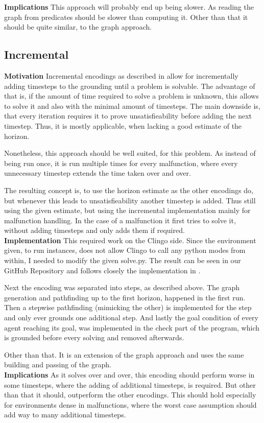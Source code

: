 \noindent \textbf{Implications} This approach will probably end up being slower. As reading the graph from predicates should be slower than computing it. Other than that it should be quite similar, to the graph approach.

\subsection{Incremental}
\textbf{Motivation} Incremental encodings as described in \cite{incr} allow for incrementally adding timesteps to the grounding until a problem is solvable. The advantage of that is, if the amount of time required to solve a problem is unknown, this allows to solve it and also with the minimal amount of timesteps. The main downside is, that every iteration requires it to prove unsatisfieability before adding the next timestep. Thus, it is mostly applicable, when lacking a good estimate of the horizon.

Nonetheless, this approach should be well suited, for this problem. As instead of being run once, it is run multiple times for every malfunction, where every unnecessary timestep extends the time taken over and over.

The resulting concept is, to use the horizon estimate as the other encodings do, but whenever this leads to unsatisfieability another timestep is added. Thus still using the given estimate, but using the incremental implementation mainly for malfunction handling. In the case of a malfunction it first tries to solve it, without adding timesteps and only adds them if required.\\

\noindent \textbf{Implementation} This required work on the Clingo side. Since the environment given, to run instances, does not allow Clingo to call any python modes from within, I needed to modify the given solve.py. The result can be seen in our GitHub Repository and follows closely the implementation in \cite{incr}.

Next the encoding was separated into steps, as described above. The graph generation and pathfinding up to the first horizon, happened in the first run. Then a stepwise pathfinding (mimicking the other) is implemented for the step and only ever grounds one additional step. And lastly the goal condition of every agent reaching its goal, was implemented in the check part of the program, which is grounded before every solving and removed afterwards.

Other than that. It is an extension of the graph approach and uses the same building and passing of the graph.\\

\noindent \textbf{Implications} As it solves over and over, this encoding should perform worse in some timesteps, where the adding of additional timesteps, is required. But other than that it should, outperform the other encodings. This should hold especially for environments dense in malfunctions, where the worst case assumption should add way to many additional timesteps.
